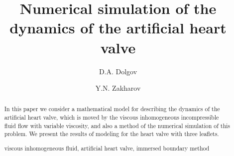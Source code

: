 \documentclass[runningheads,a4paper]{llncs}
\newcommand{\keywords}[1]{\par\addvspace\baselineskip
\noindent\keywordname\enspace\ignorespaces#1}
\begin{document}
\mainmatter  %

\title{Numerical simulation of the dynamics of the artificial heart valve}


%
%
\author{D.A. Dolgov \and Y.N. Zakharov}
%


%
%

\maketitle


\begin{abstract}
    In this paper we consider a mathematical model for describing the dynamics
    of the artificial heart valve, which is moved by the viscous inhomogeneous
    incompressible fluid flow with variable viscosity, and also a method
    of the numerical simulation of this problem. We present the results of modeling
    for the heart valve with three leaflets.
\keywords{viscous inhomogeneous fluid, artificial heart valve, immersed boundary method}
\end{abstract}
\end{document}

